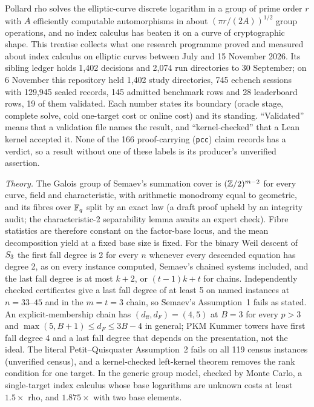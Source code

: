 Pollard rho solves the elliptic-curve discrete logarithm in a group of
prime order $r$ with $A$ efficiently computable automorphisms in about $(\pi r/(2A))^{1/2}$
group operations, and no index calculus has beaten it
on a curve of cryptographic shape. This treatise collects what one
research programme proved and measured about index calculus on elliptic
curves between July and 15 November 2026. Its sibling ledger holds
1{,}402 decisions and 2{,}074 run directories to 30 September; on
6 November this repository held 1{,}402 study directories, 745 ecbench sessions with
129{,}945 sealed records, 145 admitted benchmark rows and 28 leaderboard
rows, 19 of them validated. Each number
states its boundary (oracle stage, complete solve, cold one-target cost or
online cost) and its standing. ``Validated'' means that a validation file
names the result, and ``kernel-checked'' that a Lean kernel accepted it.
None of the 166 proof-carrying (\texttt{pcc}) claim records has a verdict,
so a result without one of these labels is its producer's unverified
assertion.

\emph{Theory.} The Galois group of Semaev's summation cover is
$(\mathbb{Z}/2)^{m-2}$ for every curve, field and characteristic, with arithmetic
monodromy equal to geometric, and its fibres over $\mathbb{F}_q$ split by an exact
law (a draft proof upheld by an integrity audit; the characteristic-2
separability lemma awaits an expert check). Fibre statistics are therefore
constant on the factor-base locus, and the mean decomposition yield at a
fixed base size is fixed. For the binary Weil descent of $S_{3}$ the first
fall degree is 2 for every $n$ whenever every descended equation has degree
2, as on every instance computed, Semaev's chained systems included, and
the last fall degree is at most $k+2$, or $(t-1)k+t$ for chains.
Independently checked certificates give a last fall degree of at least 5 on
named instances at $n=33$--$45$ and in the $m=t=3$ chain, so Semaev's
Assumption~1 fails as stated. An explicit-membership chain has
$(d_{\mathrm{ff}},d_F)=(4,5)$ at $B=3$ for every $p>3$ and
$\max(5,B+1)\le d_F\le3B-4$ in general; PKM Kummer towers have first fall
degree 4 and a last fall degree that depends on the presentation, not the
ideal. The literal Petit--Quisquater Assumption~2 fails on all 119
census instances (unverified census), and a kernel-checked left-kernel
theorem removes the rank condition for one target. In the generic group
model, checked by Monte Carlo, a single-target index calculus whose base
logarithms are unknown costs at least $1.5\times$ rho, and $1.875\times$
with two base elements.

